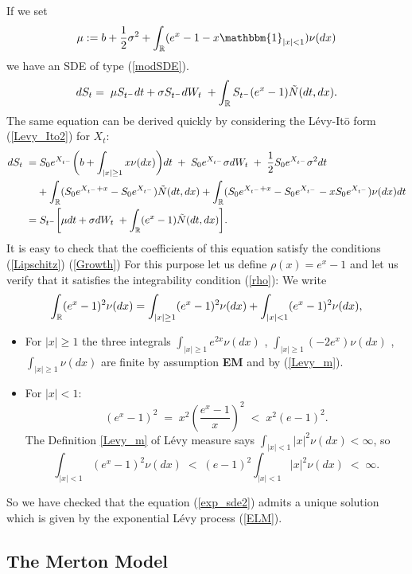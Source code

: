 If we set
\begin{equation}\label{mu}
 \mu := b + \frac{1}{2}\sigma^2 + \int_{\R} ( e^{x} - 1 -x\mathbbm{1}_{|x|<1}) \nu(dx)
\end{equation}
we have an SDE of type (\ref{modSDE}). 
\begin{equation}\label{exp_sde2}
 d S_t = \; \mu S_{t^-} dt +  \sigma S_{t^-} dW_t \; + \int_{\mathbb{R}} S_{t^-} (e^{x} - 1) \tilde N(dt,dx). 
\end{equation}
The same equation can be derived quickly by considering the Lévy-It\={o} form (\ref{Levy_Ito2}) for $X_t$:
\begin{align*}
 d S_t \; =& \; S_0 e^{X_{t^-}} \biggl( b + \int_{|x|\geq 1}x \nu(dx) \biggr) dt \; + \; S_0 e^{X_{t^-}} \sigma dW_t \; + \; \frac{1}{2}S_0 e^{X_{t^-}}\sigma^2 dt \\ \nonumber
          &+ \int_{\mathbb{R}} (S_0 e^{X_{t^-}+x} - S_0 e^{X_{t^-}}) \tilde N(dt,dx) + \int_{\mathbb{R}} (S_0 e^{X_{t^-}+x} - S_0 e^{X_{t^-}} - x S_0 e^{X_{t^-}}) \nu(dx) dt \\ \nonumber
          =& \; S_{t^-} \biggl[ \mu dt +  \sigma dW_t \; + \int_{\mathbb{R}} (e^{x} - 1) \tilde N(dt,dx) \biggr].\\
\end{align*}
It is easy to check that the coefficients of this equation satisfy the conditions (\ref{Lipschitz})
(\ref{Growth}) 
For this purpose let us define $\rho(x) = e^x-1$
and let us verify that it satisfies the integrability condition (\ref{rho}):
We write $$ \int_{\mathbb{R}} (e^x-1)^2 \nu(dx) = \int_{|x|\geq1} (e^x-1)^2 \nu(dx) + \int_{|x| < 1} (e^x-1)^2 \nu(dx),$$
 \begin{itemize}
  \item For $|x|\geq 1$ the three integrals $\int_{|x|\geq1} e^{2x} \nu(dx)$ , $\int_{|x|\geq1} (-2e^x) \nu(dx)$ ,
  $\int_{|x|\geq1} \nu(dx)$ are finite by assumption \textbf{EM} and by (\ref{Levy_m}).
  \item For $|x| < 1$: 
  $$(e^x-1)^2 \; = \; x^2 \left(\frac{e^x-1}{x}\right)^2 \; < \; x^2 (e-1)^2. $$ 
The Definition \ref{Levy_m} of Lévy measure says $ \int_{|x|<1} |x|^2 \nu(dx) < \infty $, so
$$ \int_{|x|<1} (e^x-1)^2 \nu(dx) \; < \; (e-1)^2 \int_{|x|<1} |x|^2 \nu(dx) \; < \; \infty. $$  
 \end{itemize}
So we have checked that the equation (\ref{exp_sde2}) admits a unique solution which is given by the exponential 
Lévy process (\ref{ELM}).

\subsection{The Merton Model}\label{Merton_section}

